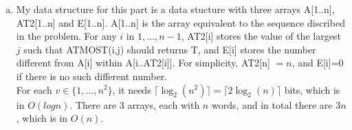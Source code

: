 \documentclass[10pt]{article}
\begin{document}
\begin{enumerate}[a.]
	\item %
		My data structure for this part is a data stucture with three arrays
		A[1..n], AT2[1..n] and E[1..n]. 
		A[1..n] is the array equivalent to the sequence discribed in the
		problem. 
		For any $i$ in $1, \ldots, n-1$, AT2[i] stores the value of the largest
		$j$ such that ATMOST(i,j) should returns T, and E[i] stores the number
		different from A[i] within A[i..AT2[i]]. 
		For simplicity, AT2[n] $= n$, and E[i]=0 if there is no such different
		number. \\

		For each $v \in \{1, \ldots, n^2\}$, it needs $\lceil \log_2(n^2)
		\rceil = \lceil 2\log_2(n) \rceil$ bits, which is in $O(log n)$. 
		There are 3 arrays, each with $n$ words, and in total there are $3n$,
		which is in $O(n)$. 


\end{enumerate}
\end{document}
